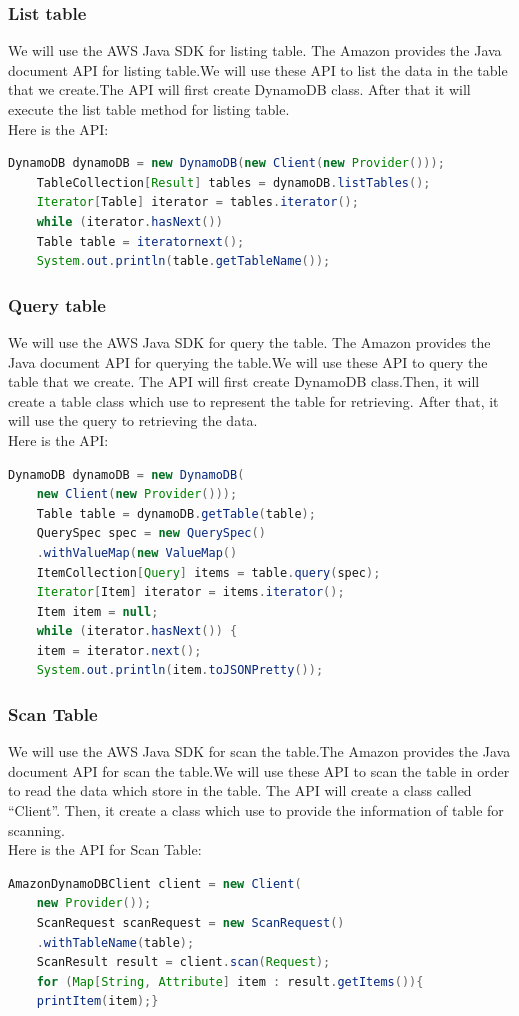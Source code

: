     \subsubsection{List table}
    We will use the AWS Java SDK for listing table. The Amazon provides the Java document API for listing table.We will use these API to list the data in the table that we create.The API will first create DynamoDB class. After that it will execute the list table method for listing table.\\
    Here is the API\cite{w1}:\\
     \begin{lstlisting}[language=Java, caption=API for list table]
    DynamoDB dynamoDB = new DynamoDB(new Client(new Provider()));
    TableCollection[Result] tables = dynamoDB.listTables();
    Iterator[Table] iterator = tables.iterator();
    while (iterator.hasNext()) 
    Table table = iteratornext();
    System.out.println(table.getTableName());
    \end{lstlisting}
    \subsubsection{Query table}
    We will use the AWS Java SDK for query the table. The Amazon provides the Java document API for querying the table.We will use these API to query the table that we create. The API will first create DynamoDB class.Then, it will create a table class which use to represent the table for retrieving. After that, it will use the query to retrieving the data.\\
    Here is the API\cite{w2}:
      \begin{lstlisting}[language=Java, caption=API for query table]
    DynamoDB dynamoDB = new DynamoDB(
    new Client(new Provider()));
    Table table = dynamoDB.getTable(table);
    QuerySpec spec = new QuerySpec()
    .withValueMap(new ValueMap()
    ItemCollection[Query] items = table.query(spec);
    Iterator[Item] iterator = items.iterator();
    Item item = null;
    while (iterator.hasNext()) {
    item = iterator.next();
    System.out.println(item.toJSONPretty());
	\end{lstlisting}
    \subsubsection{Scan Table}
    We will use the AWS Java SDK for scan the table.The Amazon provides the Java document API for scan the table.We will use these API to scan the table in order to read the data which store in the table. The API will create a class called “Client”. Then, it create a class which use to provide the information of table for scanning.\\
    Here is the API for Scan Table\cite{w3}:
      \begin{lstlisting}[language=Java, caption=API for scan table]
    AmazonDynamoDBClient client = new Client(
    new Provider());
    ScanRequest scanRequest = new ScanRequest()
    .withTableName(table);
    ScanResult result = client.scan(Request);
    for (Map[String, Attribute] item : result.getItems()){
    printItem(item);}
    \end{lstlisting}

